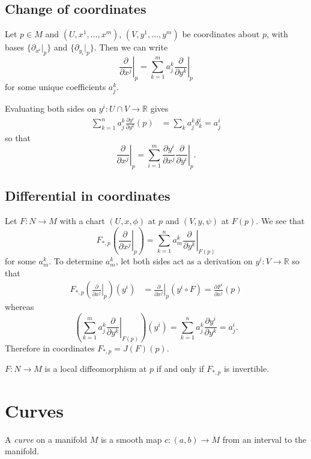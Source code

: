 \subsection{Change of coordinates}
Let $p \in M$ and $(U, x^1, \dots, x^m)$, $(V, y^1, \dots, y^m)$ be
coordinates about $p$, with bases $\{\partial_{x^i}|_p\}$ and
$\{\partial_{y_i}|_p\}$. Then we can write
$$
  \left.
    \frac{\partial}{\partial x^j}
  \right|_p
= \sum_{k=1}^m
    a_j^k
    \left.\frac{\partial}{\partial y^k}\right|_p
$$
for some unique coefficients $a_j^k$.

Evaluating both sides on $y^i: U \cap V \to \mathbb{R}$ gives
\begin{align*}
   \sum_{k=1}^n
     a_j^k
     \frac{\partial y^i}{\partial y^k}(p)
&= \sum_k a_j^k \delta_k^i = a_j^i
\end{align*}
so that
$$
  \left.\frac{\partial}{\partial x^j}\right|_p
= \sum_{i=1}^m
    \frac{\partial y^i}{\partial x^j}
    \left.
      \frac{\partial}{\partial y^i}
    \right|_p.
$$

\subsection{Differential in coordinates}
Let $F: N \to M$ with a chart $(U, x, \phi)$ at
$p$ and $(V, y, \psi)$ at $F(p)$. We see that
$$
  F_{\ast,p}
  \left(
    \left.
      \frac{\partial}{\partial x^j}
    \right|_p
  \right)
= \sum_{k=1}^n
    a_m^k
    \left.
      \frac{\partial}{\partial y^k}
    \right|_{F(p)}
$$
for some $a_m^k$. To determine $a_m^k$, let both sides act as a
derivation on $y^i: V \to \mathbb{R}$ so that
\begin{align*}
   F_{\ast, p}
     \left(
       \left.
         \frac{\partial}{\partial x^j}
       \right|_p
     \right)(y^i)
&= \left.
     \frac{\partial}{\partial x^j}
   \right|_p
     (y^i \circ F)
 = \frac{\partial F^i}{\partial x^j}(p)
\end{align*}
whereas
$$
  \left(
    \sum_{k=1}^m
      a_j^k
      \left.
        \frac{\partial}{\partial y^k}
      \right|_{F(p)}
  \right)
    (y^i)
= \sum_{k=1}^n
    a_j^k
    \frac{\partial y^i}{\partial y^k}
= a^i_j.
$$
Therefore in coordinates $F_{\ast,p} = J(F)(p).$

\begin{theorem}
$F: N \to M$ is a local diffeomorphism at $p$ if and only if
$F_{\ast,p}$ is invertible.
\end{theorem}

\section{Curves}
\begin{defn}[Curve]
A \emph{curve} on a manifold $M$ is a smooth map
$c: (a, b) \to M$ from an interval to the manifold.
\end{defn}

